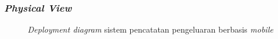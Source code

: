 \subsubsection{\emph{Physical View}}
\label{subsubsec:physical-view}
\begin{figure}[htbp]
    \centering
    \caption{\emph{Deployment diagram} sistem pencatatan pengeluaran berbasis \emph{mobile}}
    \label{fig:deployment-diagram}
\end{figure}